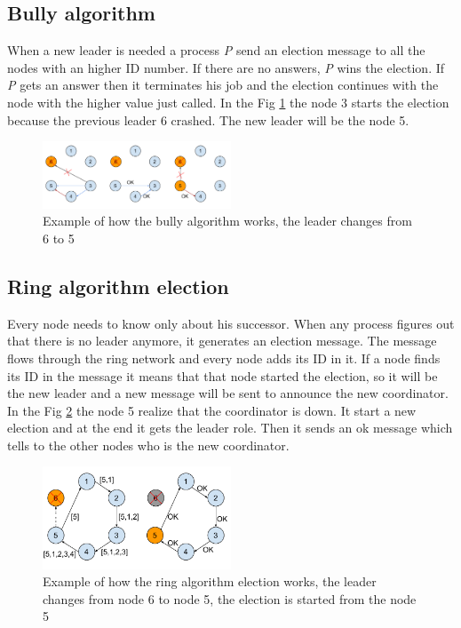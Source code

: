 \documentclass[11pt,conference]{IEEEtran}
\begin{document}
\subsection{Bully algorithm}
When a new leader is needed a process \textit{P} send an election message to all the nodes with an higher ID number. If there are no answers, \textit{P} wins the election. If \textit{P} gets an answer then it terminates his job and the election continues with the node with the higher value just called. In the Fig \ref{fig:bully} the node 3 starts the election because the previous leader 6 crashed. The new leader will be the node 5.
\begin{figure}[h!]
  \centering
    \includegraphics[width=0.5\textwidth]{bully}
    \caption{Example of how the bully algorithm works, the leader changes from 6 to 5}
    \label{fig:bully}
\end{figure}

\subsection{Ring algorithm election}
Every node needs to know only about his successor. When any process figures out that there is no leader anymore, it generates an election message. The message flows through the ring network and every node adds its ID in it. If a node finds its ID in the message it means that that node started the election, so it will be the new leader and a new message will be sent to announce the new coordinator. In the Fig \ref{fig:ring} the node 5 realize that the coordinator is down. It start a new election and at the end it gets the leader role. Then it sends an ok message which tells to the other nodes who is the new coordinator.
\begin{figure}[h!]
  \centering
    \includegraphics[width=0.5\textwidth]{ring}
    \caption{Example of how the ring algorithm election works, the leader changes from node 6 to node 5, the election is started from the node 5}
    \label{fig:ring}
\end{figure}
\end{document}
